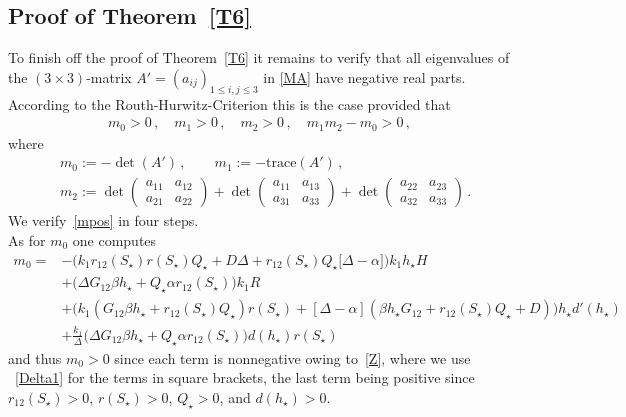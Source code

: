 \documentclass[reqno,11pt]{amsart}
\numberwithin{equation}{section}
\newcommand{\aequation}{\renewcommand{\theequation}{\mbox{A.\arabic{equation}}}}
\newcommand{\nequation}{\setcounter{equation}{0}}
\begin{document}
\begin{appendix}

\nequation
\aequation


\section{Proof of Theorem~\ref{T6}}\label{App}



To finish off the proof of Theorem~\ref{T6} it remains to verify that all eigenvalues of the $(3\times 3)$-matrix $A'=(a_{ij})_{1\le i,j\le 3}$ in \eqref{MA} have negative real parts. According to the Routh-Hurwitz-Criterion this is the case provided that
\begin{align}\label{mpos}
m_0>0\,,\quad m_1>0\,,\quad m_2>0\,,\quad m_1m_2-m_0>0\,,
\end{align}
where 
\begin{align*}
&m_0:=-\det(A')\,,\qquad m_1:=-\mathrm{trace}(A')\,,\\
&m_2:=\det\left(\begin{matrix}
a_{11} & a_{12} \\
a_{21} & a_{22}
\end{matrix}\right)
+\det\left(\begin{matrix}
a_{11} & a_{13} \\
a_{31} & a_{33}
\end{matrix}\right)
+\det
\left(\begin{matrix}
a_{22} & a_{23} \\
a_{32} & a_{33}
\end{matrix}\right)\,.
\end{align*}
We verify~\eqref{mpos} in four steps.\\

 As for $m_0$ one computes
\begin{align*}
m_0=&
-\Big( k_1 r_{12}(S_\star) r(S_\star)   Q_\star   +   D\Delta +r_{12}(S_\star) Q_\star  \big[\Delta-\alpha\big]\Big)k_1  h_\star  H\\
&+ \Big(\Delta  G_{12}  \beta  h_\star+Q_\star \alpha  r_{12}(S_\star) \Big)k_1  R\\
& +\Big(k_1 \left(G_{12}  \beta  h_\star+r_{12}(S_\star) Q_\star \right) r (S_\star )+\left[\Delta -\alpha \right] \left(\beta  h_\star G_{12} +r_{12}(S_\star) Q_\star +D\right)\Big) h_\star d'(h_\star) \\ 
&+\frac{k_1}{\Delta} \Big(\Delta  G_{12}  \beta  h_\star+Q_\star \alpha  r_{12}(S_\star) \Big) d(h_\star) r (S_\star )
\end{align*}
and thus $m_0>0$ since each term is nonnegative owing to~\eqref{Z}, where we use ~\eqref{Delta1} for the terms in square brackets, the last term being positive since $r_{12}(S_\star)>0$, $r(S_\star)>0$, $Q_\star>0$, and $d(h_\star)>0$.\\



\end{appendix}
\end{document}
